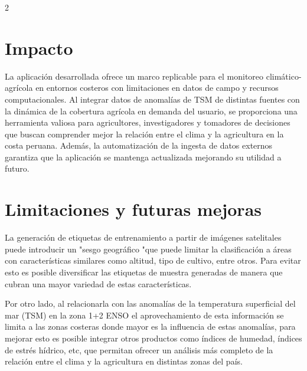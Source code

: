 \begin{multicols}{2}
          \section{Impacto}

            La aplicación desarrollada ofrece un marco replicable para el monitoreo climático-agrícola en entornos costeros con limitaciones en datos de campo y recursos computacionales. Al integrar datos de anomalías de TSM de distintas fuentes con la dinámica de la cobertura agrícola en demanda del usuario, se proporciona una herramienta valiosa para agricultores, investigadores y tomadores de decisiones que buscan comprender mejor la relación entre el clima y la agricultura en la costa peruana. Además, la automatización de la ingesta de datos externos garantiza que la aplicación se mantenga actualizada mejorando su utilidad a futuro.

          \section{Limitaciones y futuras mejoras}

            La generación de etiquetas de entrenamiento a partir de imágenes satelitales puede introducir un "sesgo geográfico "que puede limitar la clasificación a áreas con características similares como altitud, tipo de cultivo, entre otros. Para evitar esto es posible diversificar las etiquetas de muestra generadas de manera que cubran una mayor variedad de estas características.

            Por otro lado, al relacionarla con las anomalías de la temperatura superficial del mar (TSM) en la zona 1+2 ENSO el aprovechamiento de esta información se limita a las zonas costeras donde mayor es la influencia de estas anomalías, para mejorar esto es posible integrar otros productos como índices de humedad, índices de estrés hídrico, etc, que permitan ofrecer un análisis más completo de la relación entre el clima y la agricultura en distintas zonas del país.

  \end{multicols}
